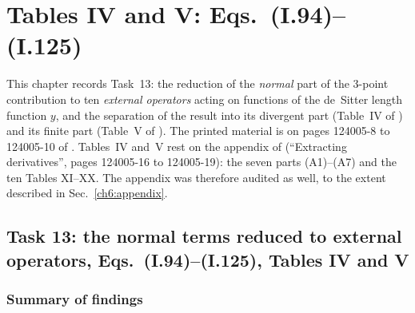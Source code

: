 \makeatletter
\providecommand{\chsixcaptionof}[2]{\def\@captype{#1}\caption{#2}}
\makeatother
\chapter{Tables IV and V: Eqs.~(I.94)--(I.125)}
\label{ch:tablesIVV}

This chapter records Task~13: the reduction of the \emph{normal} part of the 3-point contribution to ten
\emph{external operators} acting on functions of the de~Sitter length function $y$, and the separation of the
result into its divergent part (Table~IV of \PI) and its finite part (Table~V of \PI). The printed material
is on pages 124005-8 to 124005-10 of \PI. Tables~IV and~V rest on the appendix of \PI{} (``Extracting
derivatives'', pages 124005-16 to 124005-19): the seven parts (A1)--(A7) and the ten Tables XI--XX.
The appendix was therefore audited as well, to the extent described in Sec.~\ref{ch6:appendix}.

\section{Task 13: the normal terms reduced to external operators, Eqs.~(I.94)--(I.125), Tables IV and V}
\label{ch6:task13}

\subsection{Summary of findings}

